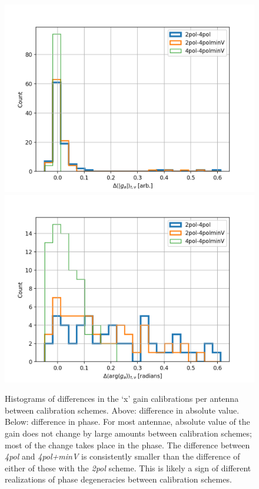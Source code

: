 \begin{figure}
\centering
\includegraphics[scale=0.5]{chapters/polcal/figures/dGainHist.png}
\includegraphics[scale=0.5]{chapters/polcal/figures/dAngleHist.png}
\caption[Histograms of differences in the `x' gain calibrations per antenna between calibration schemes.]{Histograms of differences in the `x' gain calibrations per antenna between calibration schemes. Above: difference in absolute value. Below: difference in phase.
For most antennae, absolute value of the gain does not change by large amounts between calibration schemes; most of the change takes place in the phase.
The difference between \textit{4pol} and \textit{4pol+minV} is consistently smaller than the difference of either of these with the \textit{2pol} scheme. This is likely a sign of different realizations of phase degeneracies between calibration schemes.}
\label{fig:diff-gains}
\end{figure}



